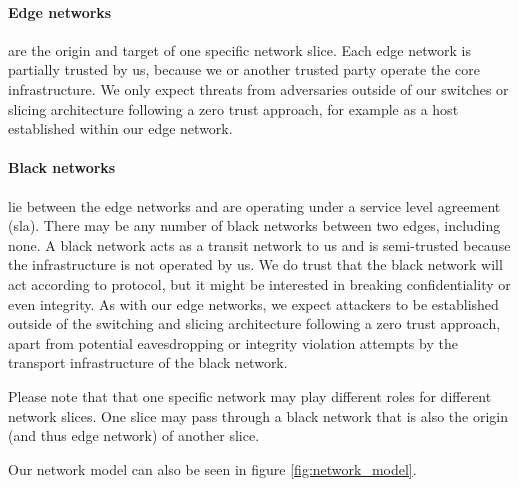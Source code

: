 \paragraph{Edge networks}
are the origin and target of one specific network slice. Each edge network is partially trusted by us, because we or another trusted party operate the core infrastructure. We only expect threats from adversaries outside of our switches or slicing architecture following a zero trust approach, for example as a host established within our edge network.
\paragraph{Black networks}
lie between the edge networks and are operating under a service level agreement (\acrshort{sla}). There may be any number of black networks between two edges, including none. A black network acts as a transit network to us and is semi-trusted because the infrastructure is not operated by us. We do trust that the black network will act according to protocol, but it might be interested in breaking confidentiality or even integrity. As with our edge networks, we expect attackers to be established outside of the switching and slicing architecture following a zero trust approach, apart from potential eavesdropping or integrity violation attempts by the transport infrastructure of the black network.

Please note that that one specific network may play different roles for different network slices. One slice may pass through a black network that is also the origin (and thus edge network) of another slice.

Our network model can also be seen in figure \ref{fig:network_model}.

